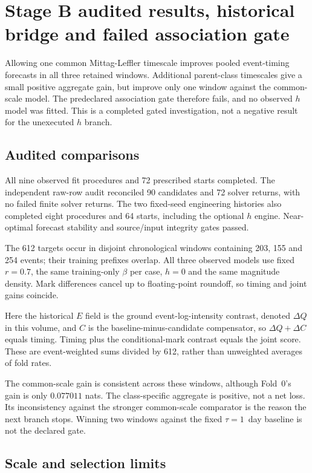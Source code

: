 \section{Stage B audited results, historical bridge and failed association gate}


Allowing one common Mittag-Leffler timescale improves pooled event-timing forecasts in all three retained windows. Additional parent-class timescales give a small positive aggregate gain, but improve only one window against the common-scale model. The predeclared association gate therefore fails, and no observed $h$ model was fitted. This is a completed gated investigation, not a negative result for the unexecuted $h$ branch.

\subsection{Audited comparisons}


All nine observed fit procedures and 72 prescribed starts completed. The independent raw-row audit reconciled 90 candidates and 72 solver returns, with no failed finite solver returns. The two fixed-seed engineering histories also completed eight procedures and 64 starts, including the optional $h$ engine. Near-optimal forecast stability and source/input integrity gates passed.

The 612 targets occur in disjoint chronological windows containing 203, 155 and 254 events; their training prefixes overlap. All three observed models use fixed $r=0.7$, the same training-only $\beta$ per case, $h=0$ and the same magnitude density. Mark differences cancel up to floating-point roundoff, so timing and joint gains coincide.


Here the historical $E$ field is the ground event-log-intensity contrast, denoted $\Delta Q$ in this volume, and $C$ is the baseline-minus-candidate compensator, so $\Delta Q+\Delta C$ equals timing. Timing plus the conditional-mark contrast equals the joint score. These are event-weighted sums divided by 612, rather than unweighted averages of fold rates.


The common-scale gain is consistent across these windows, although Fold~0's gain is only $0.077011$ nats. The class-specific aggregate is positive, not a net loss. Its inconsistency against the stronger common-scale comparator is the reason the next branch stops. Winning two windows against the fixed $\tau=1$~day baseline is not the declared gate.

\subsection{Scale and selection limits}


